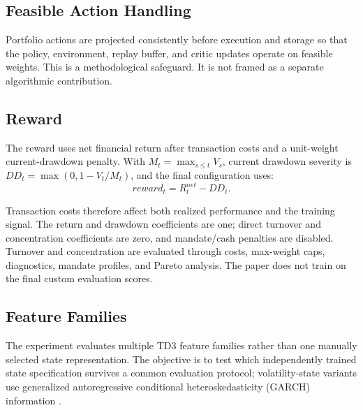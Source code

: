 \documentclass[11pt]{article}
\begin{document}
\subsection{Feasible Action Handling}

Portfolio actions are projected consistently before execution and storage so that the policy, environment, replay buffer, and critic updates operate on feasible weights. This is a methodological safeguard. It is not framed as a separate algorithmic contribution.

\subsection{Reward}

The reward uses net financial return after transaction costs and a unit-weight current-drawdown penalty. With \(M_t=\max_{s\leq t}V_s\), current drawdown severity is \(DD_t=\max(0,1-V_t/M_t)\), and the final configuration uses:
\begin{equation}
reward_t = R^{net}_t - DD_t.
\end{equation}

Transaction costs therefore affect both realized performance and the training signal. The return and drawdown coefficients are one; direct turnover and concentration coefficients are zero, and mandate/cash penalties are disabled. Turnover and concentration are evaluated through costs, max-weight caps, diagnostics, mandate profiles, and Pareto analysis. The paper does not train on the final custom evaluation scores.

\subsection{Feature Families}

The experiment evaluates multiple TD3 feature families rather than one manually selected state representation. The objective is to test which independently trained state specification survives a common evaluation protocol; volatility-state variants use generalized autoregressive conditional heteroskedasticity (GARCH) information \citep{bollerslev1986}.
\end{document}
